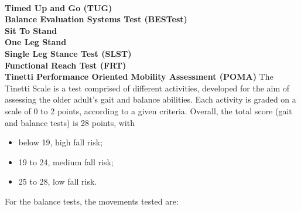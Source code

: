 \\\textbf{Timed Up and Go (TUG)}
\\\textbf{Balance Evaluation Systems Test (BESTest)}
\\\textbf{Sit To Stand}
\\\textbf{One Leg Stand}
\\\textbf{Single Leg Stance Test (SLST)}
\\\textbf{Functional Reach Test (FRT)}
\\\textbf{Tinetti Performance Oriented Mobility Assessment
(POMA)}
The Tinetti Scale is a test comprised of different activities, developed for the aim of assessing the older adult’s gait and balance abilities. Each activity is graded on a scale of 0 to 2 points, according to a given criteria. Overall, the total score (gait and balance tests) is 28 points, with 
\begin{itemize}
    \item below 19, high fall risk;
    \item 19 to 24, medium fall risk;
    \item 25 to 28, low fall risk.
\end{itemize}
For the balance tests, the movements tested are:












